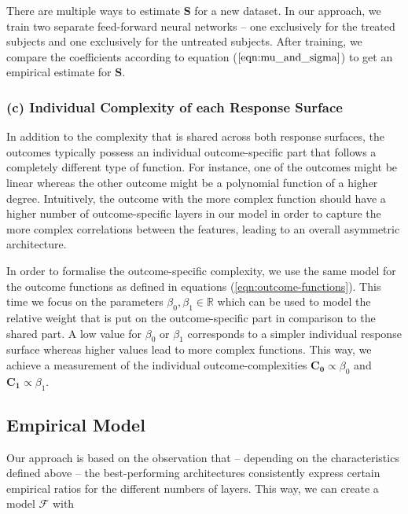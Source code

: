 There are multiple ways to estimate $\mathbf{S}$ for a new dataset. In our approach, we train two separate feed-forward neural networks -- one exclusively for the treated subjects and one exclusively for the untreated subjects. After training, we compare the coefficients according to equation ($\ref{eqn:mu_and_sigma}$) to get an empirical estimate for $\mathbf{S}$. 

\subsubsection{(c) Individual Complexity of each Response Surface}
In addition to the complexity that is shared across both response surfaces, the outcomes typically possess an individual outcome-specific part that follows a completely different type of function. For instance, one of the outcomes might be linear whereas the other outcome might be a polynomial function of a higher degree. 
Intuitively, the outcome with the more complex function should have a higher number of outcome-specific layers in our model in order to capture the more complex correlations between the features, leading to an overall asymmetric architecture. 

In order to formalise the outcome-specific complexity, we use the same model for the outcome functions as defined in equations (\ref{eqn:outcome-functions}). This time we focus on the parameters $\beta_0, \beta_1 \in \mathbb{R}$ which can be used to model the relative weight that is put on the outcome-specific part in comparison to the shared part. A low value for $\beta_0$ or $\beta_1$ corresponds to a simpler individual response surface whereas higher values lead to more complex functions.  This way, we achieve a measurement of the individual outcome-complexities $\mathbf{C_0} \propto \beta_0$ and $\mathbf{C_1} \propto \beta_1$.

\subsection{Empirical Model} \label{sec:empirical-model}
Our approach is based on the observation that -- depending on the characteristics defined above -- the best-performing architectures consistently express certain empirical ratios for the different numbers of layers. This way, we can create a model $\mathcal{F}$ with 

